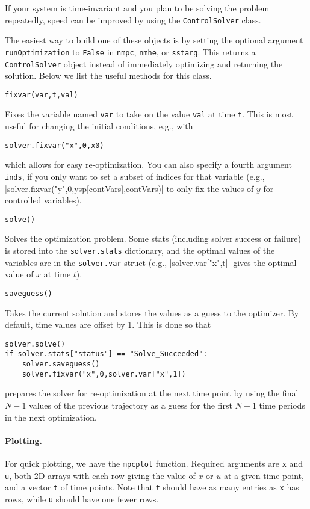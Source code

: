 \documentclass{article}
\providecommand{\lstinline}{}
\newcommand{\funcname}[2][.25em]{\vspace{#1}\noindent\texttt{#2}\nopagebreak\vspace{#1}}
\begin{document}
\begin{multicols}{2}
If your system is time-invariant and you plan to be solving the problem repeatedly, speed can be improved by using the \texttt{ControlSolver} class.

The easiest way to build one of these objects is by setting the optional argument \texttt{runOptimization} to \texttt{False} in \texttt{nmpc}, \texttt{nmhe}, or \texttt{sstarg}.
This returns a \texttt{ControlSolver} object instead of immediately optimizing and returning the solution.
Below we list the useful methods for this class.

\funcname{fixvar(var,t,val)}

Fixes the variable named \texttt{var} to take on the value \texttt{val} at time \texttt{t}.
This is most useful for changing the initial conditions, e.g., with
%
\begin{lstlisting}[frame=L]
solver.fixvar("x",0,x0)
\end{lstlisting}
%
which allows for easy re-optimization.
You can also specify a fourth argument \texttt{inds}, if you only want to set a subset of indices for that variable (e.g., \lstinline|solver.fixvar("y",0,ysp[contVars],contVars)| to only fix the values of $y$ for controlled variables).

\funcname{solve()}

Solves the optimization problem.
Some stats (including solver success or failure) is stored into the \texttt{solver.stats} dictionary, and the optimal values of the variables are in the \texttt{solver.var} struct (e.g., \lstinline|solver.var["x",t]| gives the optimal value of $x$ at time $t$).

\funcname{saveguess()}

Takes the current solution and stores the values as a guess to the optimizer.
By default, time values are offset by 1. This is done so that
%
\begin{lstlisting}[frame=L]
solver.solve()
if solver.stats["status"] == "Solve_Succeeded":
    solver.saveguess()
    solver.fixvar("x",0,solver.var["x",1])
\end{lstlisting}
%
prepares the solver for re-optimization at the next time point by using the final $N-1$ values of the previous trajectory as a guess for the first $N-1$ time periods in the next optimization.

\paragraph{Plotting.}

For quick plotting, we have the \texttt{mpcplot} function.
Required arguments are \texttt{x} and \texttt{u}, both 2D arrays with each row giving the value of $x$ or $u$ at a given time point, and a vector \texttt{t} of time points.
Note that \texttt{t} should have as many entries as \texttt{x} has rows, while \texttt{u} should have one fewer rows.


\end{multicols}
\end{document}
